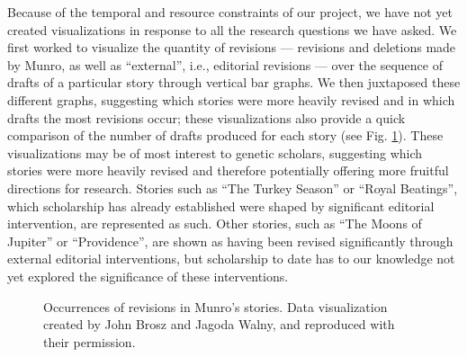 \begin{paper}
Because of the temporal and resource constraints of our project, we have
not yet created visualizations in response to all the research questions
we have asked. We first worked to visualize the quantity of
revisions –– revisions and deletions made by Munro, as well as
``external'', i.e., editorial revisions –– over the sequence of drafts of
a particular story through vertical bar graphs. We then juxtaposed these
different graphs, suggesting which stories were more heavily revised and
in which drafts the most revisions occur; these visualizations also
provide a quick comparison of the number of drafts produced for each
story (see Fig. \ref{fig:wiens3}). These visualizations may be of most interest to
genetic scholars, suggesting which stories were more heavily revised and
therefore potentially offering more fruitful directions for research.
Stories such as ``The Turkey Season'' or ``Royal Beatings'', which
scholarship has already established were shaped by significant editorial
intervention, are represented as such. Other stories, such as ``The
Moons of Jupiter'' or ``Providence'', are shown as having been revised
significantly through external editorial interventions, but scholarship
to date has to our knowledge not yet explored the significance of these
interventions.
\begin{figure}[t]
    \centering
    \caption{Occurrences of revisions in Munro's stories. Data visualization created by John Brosz and Jagoda Walny, and reproduced with their permission.}
    \label{fig:wiens3}
\end{figure}


\end{paper}
